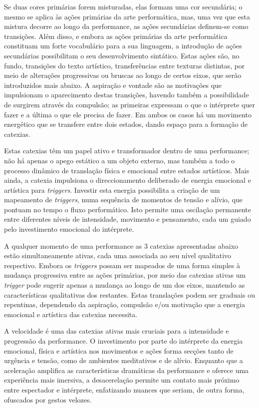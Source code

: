 \documentclass[../main.tex]{subfiles}
\begin{document}

Se duas cores primárias forem misturadas, elas formam uma cor secundária; o mesmo se aplica às ações primárias da arte performática, mas, uma vez que esta mistura decorre ao longo da performance, as ações secundárias definem-se como transições. Além disso, e embora as ações primárias da arte performática constituam um forte vocabulário para a sua linguagem, a introdução de ações secundárias possibilitam o seu desenvolvimento sintático. Estas ações são, no fundo, transições do texto artístico, transferências entre texturas distintas, por meio de alterações progressivas ou bruscas ao longo de certos eixos, que serão introduzidos mais abaixo. A aspiração e vontade são as motivações que impulsionam o aparecimento destas transições, havendo também a possibilidade de surgirem através da compulsão; as primeiras expressam o que o intérprete quer fazer e a última o que ele precisa de fazer. Em ambos os casos há um movimento energético que se transfere entre dois estados, dando espaço para a formação de catexias.

Estas catexias têm um papel ativo e transformador dentro de uma performance; não há apenas o apego estático a um objeto externo, mas também a todo o processo dinâmico de translação física e emocional entre estados artísticos. Mais ainda, a catexia impulsiona o direccionamento deliberado de energia emocional e artística para \textsl{triggers}. Investir esta energia possibilita a criação de um mapeamento de \textsl{triggers}, numa sequência de momentos de tensão e alívio, que pontuam no tempo o fluxo performático. Isto permite uma oscilação permanente entre diferentes níveis de intensidade, movimento e pensamento, cada um guiado pelo investimento emocional do intérprete.

A qualquer momento de uma performance as 3 catexias apresentadas abaixo estão simultaneamente ativas, cada uma associada ao seu nível qualitativo respectivo. Embora os \textsl{triggers} possam ser mapeados de uma forma simples à mudança progressiva entre as ações primárias, por meio das catexias ativas um \textsl{trigger} pode sugerir apenas a mudança ao longo de um dos eixos, mantendo as características qualitativas dos restantes. Estas translações podem ser graduais ou repentinas, dependendo da aspiração, compulsão e/ou motivação que a energia emocional e artística das catexias necessita.


A velocidade é uma das catexias ativas mais cruciais para a intensidade e progressão da performance. O investimento por parte do intérprete da energia emocional, física e artística nos movimentos e ações forma secções tanto de urgência e tensão, como de ambientes meditativos e de alívio. Enquanto que a aceleração amplifica as características dramáticas da performance e oferece uma experiência mais imersiva, a desacerelação permite um contato mais próximo entre espectador e intérprete, enfatizando nuances que seriam, de outra forma, ofuscados por gestos velozes.
\end{document}
